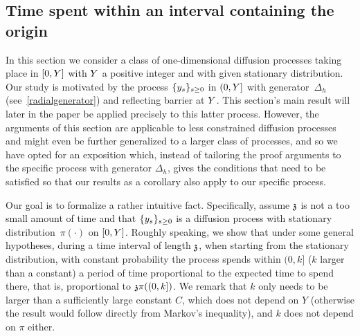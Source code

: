 
\subsection{Time spent within an interval containing the origin}
%
In this section we consider a class of one-dimensional diffusion processes taking place in $[0,\auxY]$ with $\auxY$ a positive integer  %
and with given stationary  distribution.
	Our study is motivated by the process $\{\auxy_s\}_{s\geq 0}$ in $(0,\auxY]$ with generator~$\Delta_h$
	(see~\eqref{radialgenerator}) and reflecting barrier at $\auxY$. This section's main result
	will later in the paper be applied precisely to this latter process. However, the arguments of this section are applicable to less constrained  diffusion processes and might even be further
	generalized to a larger class of processes, and so we have opted for an exposition which, instead
	of tailoring the proof arguments to the specific 
	process with generator $\Delta_h$, gives the conditions that need to be satisfied so that
	our results as a corollary also apply to our specific process.
 
   
    Our goal is to formalize a rather intuitive fact. Specifically, assume
    $\ss$ is not a too small amount of time and that 
    $\{\auxy_s\}_{s\geq 0}$ is a diffusion process with stationary distribution~$\pi(\cdot)$ on $[0,\auxY]$. Roughly speaking, we show that under some general hypotheses, during a time interval of length $\ss$, when starting from the stationary distribution,  with constant probability the process spends within $(0,k]$ ($k$ larger than a constant) a period of time proportional to the expected time to spend there, that is, proportional to $\ss\pi((0,k])$. We remark that $k$ only needs to be larger than a sufficiently large constant $C$, which does not depend on $Y$ (otherwise the result would follow directly from Markov's inequality), and $k$ does not depend on $\pi$ either.%
    
    

